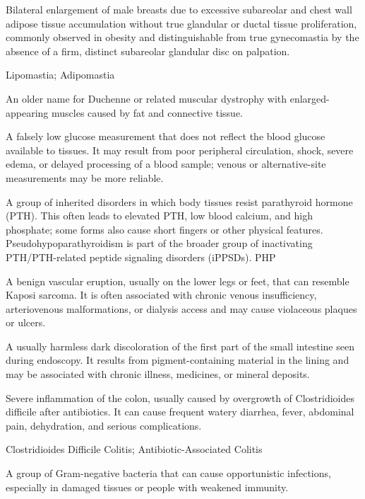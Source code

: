  Bilateral enlargement of male breasts due to excessive subareolar and chest wall adipose tissue accumulation without true glandular or ductal tissue proliferation, commonly observed in obesity and distinguishable from true gynecomastia by the absence of a firm, distinct subareolar glandular disc on palpation.

\synonyms
Lipomastia; Adipomastia

 An older name for Duchenne or related muscular dystrophy with enlarged-appearing muscles caused by fat and connective tissue.

 A falsely low glucose measurement that does not reflect the blood glucose available to tissues. It may result from poor peripheral circulation, shock, severe edema, or delayed processing of a blood sample; venous or alternative-site measurements may be more reliable.

 A group of inherited disorders in which body tissues resist parathyroid hormone (PTH). This often leads to elevated PTH, low blood calcium, and high phosphate; some forms also cause short fingers or other physical features. Pseudohypoparathyroidism is part of the broader group of inactivating PTH/PTH-related peptide signaling disorders (iPPSDs).
\synonyms
PHP

 A benign vascular eruption, usually on the lower legs or feet, that can resemble Kaposi sarcoma. It is often associated with chronic venous insufficiency, arteriovenous malformations, or dialysis access and may cause violaceous plaques or ulcers.

 A usually harmless dark discoloration of the first part of the small intestine seen during endoscopy. It results from pigment-containing material in the lining and may be associated with chronic illness, medicines, or mineral deposits.

 Severe inflammation of the colon, usually caused by overgrowth of Clostridioides difficile after antibiotics. It can cause frequent watery diarrhea, fever, abdominal pain, dehydration, and serious complications.

\synonyms
Clostridioides Difficile Colitis; Antibiotic-Associated Colitis

 A group of Gram-negative bacteria that can cause opportunistic infections, especially in damaged tissues or people with weakened immunity.

